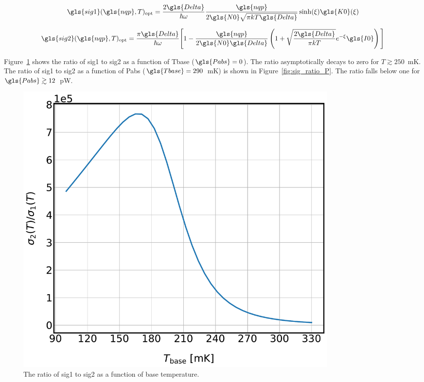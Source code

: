 \begin{equation}
  \gls{sig1}(\gls{nqp}, T)_{\mathrm{opt}} = \frac{2\gls{Delta}}{\hbar \omega} \frac{ \gls{nqp}} { 2\gls{N0}\sqrt{\pi kT\gls{Delta}}}\sinh(\xi)\gls{K0}(\xi)
\end{equation}

\begin{equation}
  \gls{sig2}(\gls{nqp}, T)_{\mathrm{opt}} = \frac{ \pi\gls{Delta} }{ \hbar\omega } \Bigg[ 1 - \frac{ \gls{nqp} }{ 2\gls{N0}\gls{Delta} } \left( 1 +
  \sqrt{ \frac{ 2 \gls{Delta} }{ \pi kT } } e^{-\xi} \gls{I0} \right) \Bigg]
\end{equation}

Figure~\ref{fig:sig_ratio_T} shows the ratio of \gls{sig1} to \gls{sig2} as a function of \gls{Tbase} ($\gls{Pabs} = 0$). The ratio asymptotically decays to zero for $T \gtrsim 250$~mK. The ratio of \gls{sig1} to \gls{sig2} as a function of \gls{Pabs} ($\gls{Tbase} = 290$~mK) is shown in Figure~\ref{fig:sig_ratio_P}. The ratio falls below one for $\gls{Pabs} \gtrsim 12$~pW.

\begin{figure}[!htbp]
\centering
\includegraphics[width=0.8\textwidth]{figures/kid_model/sig_ratio_T}
\caption[~The ratio of  to  as a function of base temperature.]{The ratio of \gls{sig1} to \gls{sig2} as a function of base temperature.}
\label{fig:sig_ratio_T}
\end{figure}

